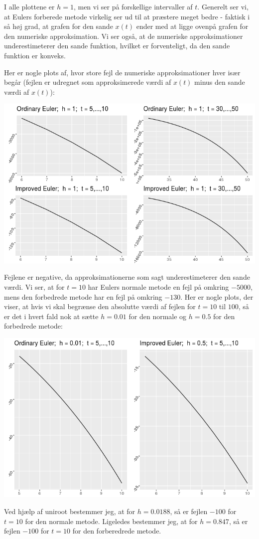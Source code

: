 \documentclass[12pt]{article}
\begin{document}
I alle plottene er $h=1$, men vi ser på forskellige intervaller af $t$. Generelt ser vi, at Eulers forberede metode virkelig ser ud til at præstere meget bedre - faktisk i så høj grad, at grafen for den sande $x(t)$ ender med at ligge ovenpå grafen for den numeriske approksimation. Vi ser også, at de numeriske approksimationer underestimeterer den sande funktion, hvilket er forventeligt, da den sande funktion er konveks.

Her er nogle plots af, hvor store fejl de numeriske approksimationer hver især begår (fejlen er udregnet som approksimerede værdi af $x(t)$ minus den sande værdi af $x(t)$):

\begin{center}
\includegraphics[scale=0.5]{q3p3.png}
\end{center}

Fejlene er negative, da approksimationerne som sagt underestimeterer den sande værdi. Vi ser, at for $t=10$ har Eulers normale metode en fejl på omkring $-5000$, mens den forbedrede metode har en fejl på omkring $-130$. Her er nogle plots, der viser, at hvis vi skal begrænse den absolutte værdi af fejlen for $t=10$ til $100$, så er det i hvert fald nok at sætte $h=0.01$ for den normale og $h=0.5$ for den forbedrede metode:
\begin{center}
\includegraphics[scale=0.5]{q3p4.png}
\end{center}
Ved hjælp af uniroot bestemmer jeg, at for $h=0.0188$, så er fejlen $-100$ for $t=10$ for den normale metode. Ligeledes bestemmer jeg, at for $h=0.847$, så er fejlen $-100$ for $t=10$ for den forberedrede metode. 
\end{document}
